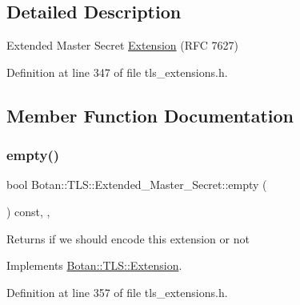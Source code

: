 \subsection{Detailed Description}
Extended Master Secret \mbox{\hyperlink{class_botan_1_1_t_l_s_1_1_extension}{Extension}} (R\+FC 7627) 

Definition at line 347 of file tls\+\_\+extensions.\+h.



\subsection{Member Function Documentation}
\mbox{\label{class_botan_1_1_t_l_s_1_1_extended___master___secret_ab7445933ce793c95ef1576bf35d1154c}} 
\subsubsection{\texorpdfstring{empty()}{empty()}}
{\footnotesize\ttfamily bool Botan\+::\+T\+L\+S\+::\+Extended\+\_\+\+Master\+\_\+\+Secret\+::empty (\begin{DoxyParamCaption}{ }\end{DoxyParamCaption}) const\hspace{0.3cm}{\ttfamily [inline]}, {\ttfamily [override]}, {\ttfamily [virtual]}}

\begin{DoxyReturn}{Returns}
if we should encode this extension or not 
\end{DoxyReturn}


Implements \mbox{\hyperlink{class_botan_1_1_t_l_s_1_1_extension_aa850b9be2322f94e7c65e583cd51acc5}{Botan\+::\+T\+L\+S\+::\+Extension}}.



Definition at line 357 of file tls\+\_\+extensions.\+h.

\mbox{\label{class_botan_1_1_t_l_s_1_1_extended___master___secret_a4665dff15e868d0f9f45d934767d9507}} 
